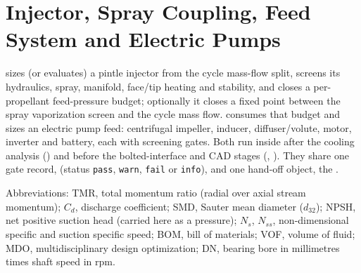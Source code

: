 \chapter{Injector, Spray Coupling, Feed System and Electric Pumps}\label{ch:s08-s09}


 sizes (or evaluates) a pintle injector from the cycle mass-flow
split, screens its hydraulics, spray, manifold, face/tip heating and stability,
and closes a per-propellant feed-pressure budget; optionally it closes a fixed
point between the spray vaporization screen and the cycle mass flow.
 consumes that budget and sizes an electric pump feed: centrifugal
impeller, inducer, diffuser/volute, motor, inverter and battery, each with
screening gates. Both run inside  after the cooling
analysis () and before the bolted-interface and CAD stages
(, ). They share one gate record,
 (status \texttt{pass}, \texttt{warn},
\texttt{fail} or \texttt{info}), and one hand-off object, the
.

Abbreviations: TMR, total momentum ratio (radial over axial stream momentum);
$C_d$, discharge coefficient; SMD, Sauter mean diameter ($d_{32}$); NPSH, net
positive suction head (carried here as a pressure); $N_s$, $N_{ss}$,
non-dimensional specific and suction specific speed; BOM, bill of materials;
VOF, volume of fluid; MDO, multidisciplinary design optimization; DN, bearing
bore in millimetres times shaft speed in rpm.


